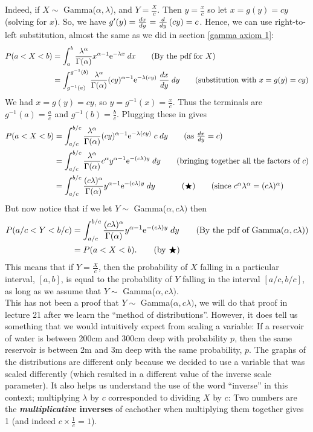 \noindent Indeed, if $X \sim$ Gamma($\alpha,\lambda$), and $Y = \frac{X}{c}$. Then $y = \frac{x}{c}$ so let $x = g(y) = cy$ (solving for $x$). So, we have $g'(y) = \frac{dx}{dy} = \frac{d}{dy}\left(cy\right) = c$. Hence, we can use right-to-left substitution, almost the same as we did in section \ref{gamma axiom 1}:
\begin{align*}
P(a < X < b) & = \int_a^b \frac{\lambda^\alpha}{\Gamma(\alpha)}x^{\alpha - 1} \mathrm{e}^{-\lambda x} \; dx \tag{By the pdf for $X$} \\
	& = \int_{g^{-1}(a)}^{g^{-1}(b)} \frac{\lambda^\alpha}{\Gamma(\alpha)}(cy)^{\alpha - 1} \mathrm{e}^{-\lambda (cy)} \; \frac{dx}{dy} \; dy \tag{substitution with $x = g(y) = cy$}
\end{align*}
We had $x = g(y) = cy$, so $y = g^{-1}(x) = \frac{x}{c}$. Thus the terminals are $g^{-1}(a) = \frac{a}{c}$ and $g^{-1}(b) = \frac{b}{c}.$ Plugging these in gives
\begin{align*}
P(a < X < b) & = \int_{a/c}^{b/c} \frac{\lambda^\alpha}{\Gamma(\alpha)}(cy)^{\alpha - 1} \e^{-\lambda (cy)} \; c \; dy \tag{as $\frac{dx}{dy} = c$} \\
	& = \int_{a/c}^{b/c} \frac{\lambda^\alpha}{\Gamma(\alpha)} c^\alpha y^{\alpha - 1} \e^{-(c \lambda) y} \; dy \tag{bringing together all the factors of $c$} \\
	& =  \int_{a/c}^{b/c} \frac{(c \lambda)^\alpha}{\Gamma(\alpha)} y^{\alpha - 1} \e^{-(c \lambda)y} \; dy \;\;\;\;\;\;\;\;\;\;\;\; (\bigstar) \tag{since $c^\alpha \lambda^\alpha = (c \lambda)^\alpha$}
\end{align*}
But now notice that if we let $Y \sim$ Gamma($\alpha,c \lambda)$ then
\begin{align*}
P(a/c < Y < b/c) & =  \int_{a/c}^{b/c} \frac{(c \lambda)^\alpha}{\Gamma(\alpha)} y^{\alpha - 1} \mathrm{e}^{-(c \lambda)y} \; dy \tag{By the pdf of Gamma($\alpha,c \lambda$)} \\
	& = P(a < X < b). \tag{by $\bigstar$}
\end{align*}
This means that if $Y = \frac{X}{c}$, then the probability of $X$ falling in a particular interval, $[a,b]$, is equal to the probability of $Y$ falling in the interval $[a/c,b/c]$, as long as we assume that $Y \sim$ Gamma($\alpha,c \lambda)$. \\

\noindent This has not been a proof that $Y \sim$ Gamma($\alpha,c \lambda)$, we will do that proof in lecture 21 after we learn the ``method of distributions''. However, it does tell us something that we would intuitively expect from scaling a variable: If a reservoir of water is between 200cm and 300cm deep with probability $p$, then the same reservoir is between 2m and 3m deep with the same probability, $p$. The graphs of the distributions are different only because we decided to use a variable that was scaled differently (which resulted in a different value of the inverse scale parameter). It also helps us understand the use of the word ``inverse'' in this context; multiplying $\lambda$ by $c$ corresponded to dividing $X$ by $c$: Two numbers are the \textbf{\textit{multiplicative} inverses} of eachother when multiplying them together gives 1 (and indeed $c\times\frac{1}{c} = 1$).  \label{multiplicative inverses}


